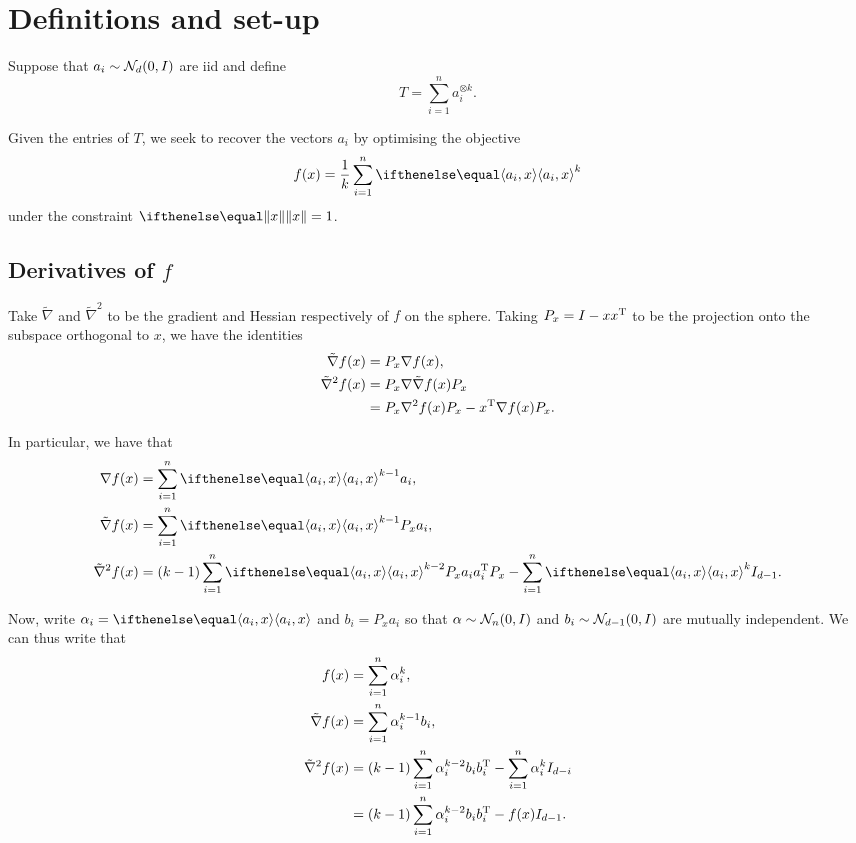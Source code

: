 \documentclass{hw-scrartcl}
\begin{document}
\maketitle
\section{Definitions and set-up}

Suppose that \(a_i \sim \mathcal{N}_d(0, I)\) are iid and define
\[
  T
  = \sum_{i=1}^n a_i^{\otimes k}.
\]

Given the entries of \(T\), we seek to recover the vectors \(a_i\) by optimising the objective
\[
  f(x)
  = \frac{1}{k}\sum_{i=1}^n \iprod{a_i}{x}^k
\]
under the constraint \(\norm{x} = 1\).

\subsection{Derivatives of \(f\)}
Take \(\tilde{\nabla}\) and \(\tilde{\nabla}^2\) to be the gradient and Hessian respectively of \(f\) on the sphere. Taking \(P_x = I - xx^{\mathrm{T}}\) to be the projection onto the subspace orthogonal to \(x\), we have the identities
\begin{align*}
  \tilde{\nabla} f(x)
  &= P_x \nabla f(x),\\
  \tilde{\nabla}^2 f(x)
  &= P_x \nabla \tilde{\nabla}f(x) P_x \\
  &= P_x \nabla^2 f(x) P_x - x^{\mathrm{T}} \nabla f(x) P_x.
\end{align*}

In particular, we have that
\begin{align*}
  \nabla f(x)
  &= \sum_{i=1}^n \iprod{a_i}{x}^{k-1} a_i,\\
  \tilde{\nabla} f(x)
  &= \sum_{i=1}^n \iprod{a_i}{x}^{k-1} P_x a_i,\\
  \tilde{\nabla}^2 f(x)
  &= (k-1) \sum_{i=1}^n \iprod{a_i}{x}^{k-2}P_x a_i a_i\transp P_x - \sum_{i=1}^n \iprod{a_i}{x}^k \Id_{d-1}.
\end{align*}

Now, write \(\alpha_i = \iprod{a_i}{x}\) and \(b_i = P_xa_i\) so that \(\alpha \sim \mathcal{N}_n(0, I)\) and \(b_i \sim \mathcal{N}_{d-1}(0, I)\) are mutually independent. We  can thus write that
\begin{align*}
  f(x)
  &= \sum_{i=1}^n \alpha_i^k, \\
  \tilde{\nabla} f(x)
  &= \sum_{i=1}^n \alpha_i^{k-1} b_i, \\
  \tilde{\nabla}^2 f(x)
  &= (k-1)\sum_{i=1}^n \alpha_i^{k-2} b_i b_i^{\mathrm{T}} - \sum_{i=1}^n \alpha_i^k I_{d-i} \\
  &= (k-1)\sum_{i=1}^n \alpha_i^{k-2} b_i b_i^{\mathrm{T}} - f(x)I_{d-1}.
\end{align*}
\end{document}
